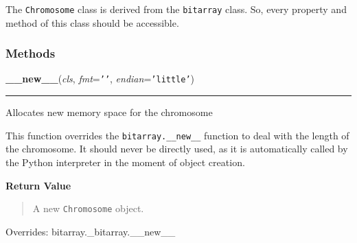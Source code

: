 The \texttt{Chromosome} class is derived from the \texttt{bitarray} class. So, every
property and method of this class should be accessible.


  \subsubsection{Methods}

    \vspace{0.5ex}

    \begin{boxedminipage}{\textwidth}

    \raggedright \textbf{\_\_new\_\_}(\textit{cls}, \textit{fmt}=\texttt{\texttt{'}\texttt{}\texttt{'}}, \textit{endian}=\texttt{\texttt{'}\texttt{little}\texttt{'}})

    \vspace{-1.5ex}

    \rule{\textwidth}{0.5\fboxrule}

Allocates new memory space for the chromosome

This function overrides the \texttt{bitarray.{\_}{\_}new{\_}{\_}} function to deal with
the length of the chromosome. It should never be directly used, as it is
automatically called by the Python interpreter in the moment of object
creation.
    \vspace{1ex}

      \textbf{Return Value}
      \begin{quote}

A new \texttt{Chromosome} object.
      \end{quote}

    \vspace{1ex}

      Overrides: bitarray.\_bitarray.\_\_new\_\_

    \end{boxedminipage}

    \vspace{0.5ex}

